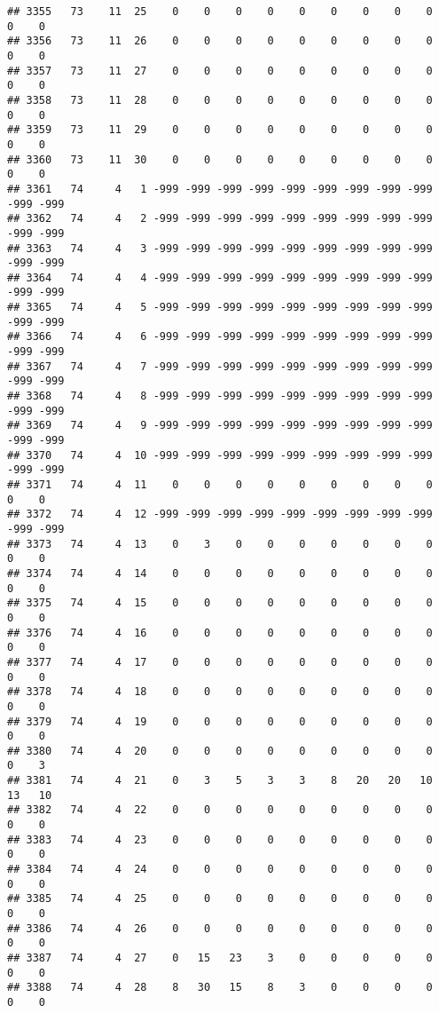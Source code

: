 \documentclass[]{article}
\begin{document}
\begin{verbatim}
## 3355   73    11  25    0    0    0    0    0    0    0    0    0    0    0
## 3356   73    11  26    0    0    0    0    0    0    0    0    0    0    0
## 3357   73    11  27    0    0    0    0    0    0    0    0    0    0    0
## 3358   73    11  28    0    0    0    0    0    0    0    0    0    0    0
## 3359   73    11  29    0    0    0    0    0    0    0    0    0    0    0
## 3360   73    11  30    0    0    0    0    0    0    0    0    0    0    0
## 3361   74     4   1 -999 -999 -999 -999 -999 -999 -999 -999 -999 -999 -999
## 3362   74     4   2 -999 -999 -999 -999 -999 -999 -999 -999 -999 -999 -999
## 3363   74     4   3 -999 -999 -999 -999 -999 -999 -999 -999 -999 -999 -999
## 3364   74     4   4 -999 -999 -999 -999 -999 -999 -999 -999 -999 -999 -999
## 3365   74     4   5 -999 -999 -999 -999 -999 -999 -999 -999 -999 -999 -999
## 3366   74     4   6 -999 -999 -999 -999 -999 -999 -999 -999 -999 -999 -999
## 3367   74     4   7 -999 -999 -999 -999 -999 -999 -999 -999 -999 -999 -999
## 3368   74     4   8 -999 -999 -999 -999 -999 -999 -999 -999 -999 -999 -999
## 3369   74     4   9 -999 -999 -999 -999 -999 -999 -999 -999 -999 -999 -999
## 3370   74     4  10 -999 -999 -999 -999 -999 -999 -999 -999 -999 -999 -999
## 3371   74     4  11    0    0    0    0    0    0    0    0    0    0    0
## 3372   74     4  12 -999 -999 -999 -999 -999 -999 -999 -999 -999 -999 -999
## 3373   74     4  13    0    3    0    0    0    0    0    0    0    0    0
## 3374   74     4  14    0    0    0    0    0    0    0    0    0    0    0
## 3375   74     4  15    0    0    0    0    0    0    0    0    0    0    0
## 3376   74     4  16    0    0    0    0    0    0    0    0    0    0    0
## 3377   74     4  17    0    0    0    0    0    0    0    0    0    0    0
## 3378   74     4  18    0    0    0    0    0    0    0    0    0    0    0
## 3379   74     4  19    0    0    0    0    0    0    0    0    0    0    0
## 3380   74     4  20    0    0    0    0    0    0    0    0    0    0    3
## 3381   74     4  21    0    3    5    3    3    8   20   20   10   13   10
## 3382   74     4  22    0    0    0    0    0    0    0    0    0    0    0
## 3383   74     4  23    0    0    0    0    0    0    0    0    0    0    0
## 3384   74     4  24    0    0    0    0    0    0    0    0    0    0    0
## 3385   74     4  25    0    0    0    0    0    0    0    0    0    0    0
## 3386   74     4  26    0    0    0    0    0    0    0    0    0    0    0
## 3387   74     4  27    0   15   23    3    0    0    0    0    0    0    0
## 3388   74     4  28    8   30   15    8    3    0    0    0    0    0    0

\end{verbatim}
\end{document}
